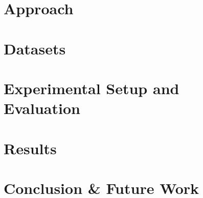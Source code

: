\documentclass{article}
\begin{document}
\section{Approach}


\section{Datasets}

% 
% 
% 
\section{Experimental Setup and Evaluation}


\section{Results}


\section{Conclusion \& Future Work}



%

%
%


\end{document}
